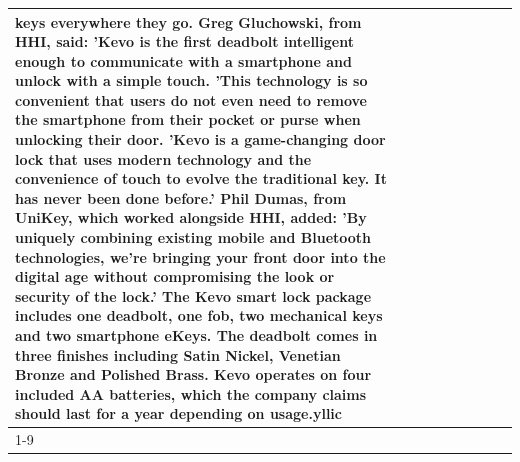 \begin{table}[H]
\begin{tabular}{lllrlllll}
keys everywhere they go. Greg Gluchowski, from HHI, said: 'Kevo is the first deadbolt intelligent enough to communicate with a smartphone and unlock with a simple touch. 'This technology is so convenient that users do not even need to remove the smartphone from their pocket or purse when unlocking their door. 'Kevo is a game-changing door lock that uses modern technology and the convenience of touch to evolve the traditional key. It has never been done before.' Phil Dumas, from UniKey, which worked alongside HHI, added: 'By uniquely combining existing mobile and Bluetooth technologies, we’re bringing your front door into the digital age without compromising the look or security of the lock.' The Kevo smart lock package includes one deadbolt, one fob, two mechanical keys and two smartphone eKeys. The deadbolt comes in three finishes including Satin Nickel, Venetian Bronze and Polished Brass. Kevo operates on four included AA batteries, which the company claims should last for a year depending on usage.yllic \\
\cline{1-9}

\end{tabular}
\end{table}
